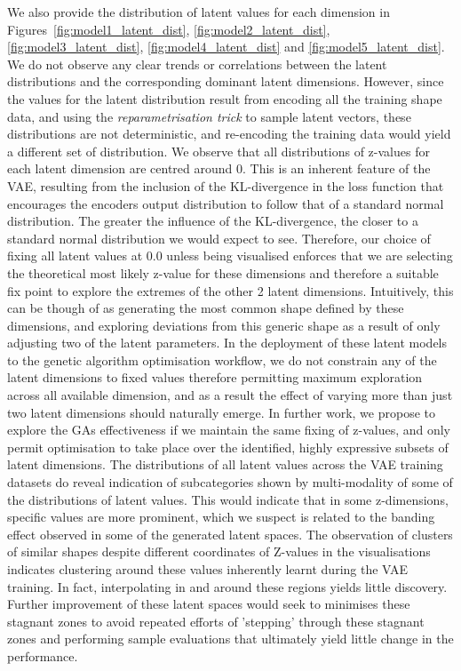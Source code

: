 \documentclass{article}
\begin{document}
We also provide the distribution of latent values for each dimension in Figures~\ref{fig:model1_latent_dist}, \ref{fig:model2_latent_dist}, \ref{fig:model3_latent_dist}, \ref{fig:model4_latent_dist} and \ref{fig:model5_latent_dist}. We do not observe any clear trends or correlations between the latent distributions and the corresponding dominant latent dimensions. However, since the values for the latent distribution result from encoding all the training shape data, and using the \textit{reparametrisation trick} to sample latent vectors, these distributions are not deterministic, and re-encoding the training data would yield a different set of distribution. We observe that all distributions of z-values for each latent dimension are centred around 0. This is an inherent feature of the VAE, resulting from the inclusion of the KL-divergence in the loss function that encourages the encoders output distribution to follow that of a standard normal distribution. The greater the influence of the KL-divergence, the closer to a standard normal distribution we would expect to see. Therefore, our choice of fixing all latent values at 0.0 unless being visualised enforces that we are selecting the theoretical most likely z-value for these dimensions and therefore a suitable fix point to explore the extremes of the other 2 latent dimensions. Intuitively, this can be though of as generating the most common shape defined by these dimensions, and exploring deviations from this generic shape as a result of only adjusting two of the latent parameters. In the deployment of these latent models to the genetic algorithm optimisation workflow, we do not constrain any of the latent dimensions to fixed values therefore permitting maximum exploration across all available dimension, and as a result the effect of varying more than just two latent dimensions should naturally emerge. In further work, we propose to explore the GAs effectiveness if we maintain the same fixing of z-values, and only permit optimisation to take place over the identified, highly expressive subsets of latent dimensions. The distributions of all latent values across the VAE training datasets do reveal indication of subcategories shown by multi-modality of some of the distributions of latent values. This would indicate that in some z-dimensions, specific values are more prominent, which we suspect is related to the banding effect observed in some of the generated latent spaces. The observation of clusters of similar shapes despite different coordinates of Z-values in the visualisations indicates clustering around these values inherently learnt during the VAE training. In fact, interpolating in and around these regions yields little discovery. Further improvement of these latent spaces would seek to minimises these stagnant zones to avoid repeated efforts of 'stepping' through these stagnant zones and performing sample evaluations that ultimately yield little change in the performance. 
\end{document}
